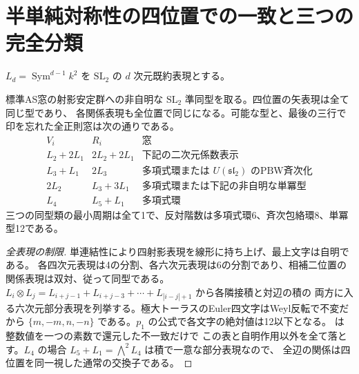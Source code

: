 \section{半単純対称性の四位置での一致と三つの完全分類}
\label{sec:sl2-window-profiles}
$L_d=\operatorname{Sym}^{d-1}k^2$ を $\mathrm{SL}_2$ の $d$ 次元既約表現とする。
\begin{theorem}\label{thm:sl2-window-profiles}
標準AS窓の射影安定群への非自明な $\mathrm{SL}_2$ 準同型を取る。四位置の矢表現は全て同じ型であり、
各関係表現も全位置で同じになる。可能な型と、最後の三行で印を忘れた全正則窓は次の通りである。
\[
\begin{array}{c|c|l}
 V_i & R_i & \text{窓}\\\hline
 L_2+2L_1 & 2L_2+2L_1 & \text{下記の二次元係数表示}\\
 L_3+L_1 & 2L_3 & \text{多項式環または }U(\mathfrak{sl}_2)\text{ のPBW斉次化}\\
 2L_2 & L_3+3L_1 & \text{多項式環または下記の非自明な単冪型}\\
 L_4 & L_5+L_1 & \text{多項式環}
\end{array}
\]
三つの同型類の最小周期は全て1で、反対階数は多項式環6、斉次包絡環8、単冪型12である。
\end{theorem}
\begin{proof}[全表現の制限]
単連結性により四射影表現を線形に持ち上げ、最上文字は自明である。
各四次元表現は4の分割、各六次元表現は6の分割であり、相補二位置の関係表現は双対、従って同型である。
$L_i\otimes L_j=L_{i+j-1}+L_{i+j-3}+\cdots+L_{|i-j|+1}$ から各隣接積と対辺の積の
両方に入る六次元部分表現を列挙する。極大トーラスのEuler四文字はWeyl反転で不変だから
$\{m,-m,n,-n\}$ である。$p_1$ の公式で各文字の絶対値は12以下となる。
 は整数値を一つの素数で還元した不一致だけで
この表と自明作用以外を全て落とす。$L_4$ の場合 $L_5+L_1=\bigwedge^2 L_4$ は積で一意な部分表現なので、
全辺の関係は四位置を同一視した通常の交換子である。
\end{proof}

